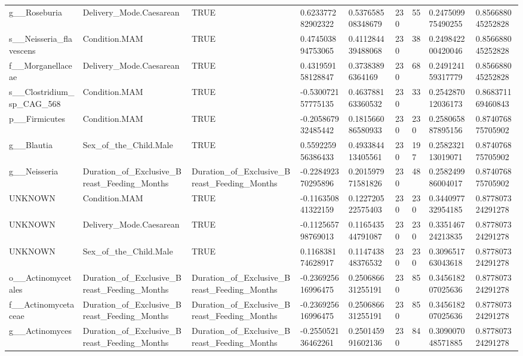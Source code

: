 \begin{longtable}{lllllllll}
g\_\_Roseburia & Delivery\_Mode.Caesarean & TRUE & 0.623377282902322 & 0.537658508348679 & 230 & 55 & 0.247509975490255 & 0.856688045252828 \\
s\_\_Neisseria\_flavescens & Condition.MAM & TRUE & 0.474503894753065 & 0.411284439488068 & 230 & 38 & 0.249842200420046 & 0.856688045252828 \\
f\_\_Morganellaceae & Delivery\_Mode.Caesarean & TRUE & 0.431959158128847 & 0.37383896364169 & 230 & 68 & 0.249124159317779 & 0.856688045252828 \\
s\_\_Clostridium\_sp\_CAG\_568 & Condition.MAM & TRUE & -0.530072157775135 & 0.463788163360532 & 230 & 33 & 0.254287012036173 & 0.868371169460843 \\
p\_\_Firmicutes & Condition.MAM & TRUE & -0.205867932485442 & 0.181566086580933 & 230 & 230 & 0.258065887895156 & 0.874076875705902 \\
g\_\_Blautia & Sex\_of\_the\_Child.Male & TRUE & 0.559225956386433 & 0.493384413405561 & 230 & 197 & 0.258232113019071 & 0.874076875705902 \\
g\_\_Neisseria & Duration\_of\_Exclusive\_Breast\_Feeding\_Months & Duration\_of\_Exclusive\_Breast\_Feeding\_Months & -0.228492370295896 & 0.201597971581826 & 230 & 48 & 0.258249986004017 & 0.874076875705902 \\
UNKNOWN & Condition.MAM & TRUE & -0.116350841322159 & 0.122720522575403 & 230 & 230 & 0.344097732954185 & 0.877807324291278 \\
UNKNOWN & Delivery\_Mode.Caesarean & TRUE & -0.112565798769013 & 0.116543544791087 & 230 & 230 & 0.335146724213835 & 0.877807324291278 \\
UNKNOWN & Sex\_of\_the\_Child.Male & TRUE & 0.116838174628917 & 0.114743848376532 & 230 & 230 & 0.309651763043618 & 0.877807324291278 \\
o\_\_Actinomycetales & Duration\_of\_Exclusive\_Breast\_Feeding\_Months & Duration\_of\_Exclusive\_Breast\_Feeding\_Months & -0.236925616996475 & 0.250686631255191 & 230 & 85 & 0.345618207025636 & 0.877807324291278 \\
f\_\_Actinomycetaceae & Duration\_of\_Exclusive\_Breast\_Feeding\_Months & Duration\_of\_Exclusive\_Breast\_Feeding\_Months & -0.236925616996475 & 0.250686631255191 & 230 & 85 & 0.345618207025636 & 0.877807324291278 \\
g\_\_Actinomyces & Duration\_of\_Exclusive\_Breast\_Feeding\_Months & Duration\_of\_Exclusive\_Breast\_Feeding\_Months & -0.255052136462261 & 0.250145991602136 & 230 & 84 & 0.309007048571885 & 0.877807324291278 \\

\end{longtable}
